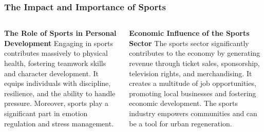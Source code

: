 \documentclass[5pt]{beamer}
\begin{document}
\begin{frame}
\frametitle{The Impact and Importance of Sports}
\begin{columns}
\begin{column}{0.45\textwidth}
\begin{block}{\textbf{The Role of Sports in Personal Development}}
Engaging in sports contributes massively to physical health, fostering teamwork skills and character development. It equips individuals with discipline, resilience, and the ability to handle pressure. Moreover, sports play a significant part in emotion regulation and stress management.
\end{block}
\end{column}
\begin{column}{0.45\textwidth}
\begin{block}{\textbf{Economic Influence of the Sports Sector}}
The sports sector significantly contributes to the economy by generating revenue through ticket sales, sponsorship, television rights, and merchandising. It creates a multitude of job opportunities, promoting local businesses and fostering economic development. The sports industry empowers communities and can be a tool for urban regeneration.
\end{block}
\end{column}
\end{columns}
\end{frame}
\end{document}
